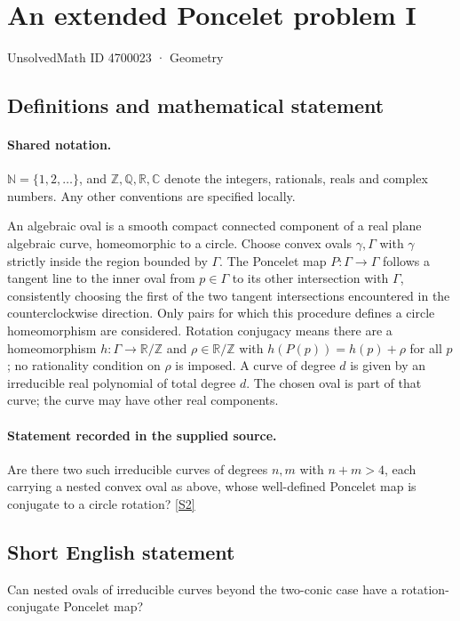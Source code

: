 \documentclass[11pt]{article}
\newcommand{\sref}[2]{\hyperlink{source:#1:#2}{[S#2]}}
\begin{document}
\setcounter{section}{4700022}
\section{An extended Poncelet problem I}\label{4700023}
{\small\sffamily UnsolvedMath ID 4700023 · Geometry}
\subsection{Definitions and mathematical statement}

\paragraph{Shared notation.}$\mathbb N=\{1,2,\ldots\}$, and $\mathbb Z,\mathbb Q,\mathbb R,\mathbb C$ denote the integers, rationals, reals and complex numbers. Any other conventions are specified locally.


An algebraic oval is a smooth compact connected component of a real plane algebraic curve, homeomorphic to a circle. Choose convex ovals $\gamma,\Gamma$ with $\gamma$ strictly inside the region bounded by $\Gamma$. The Poncelet map $P:\Gamma\to\Gamma$ follows a tangent line to the inner oval from $p\in\Gamma$ to its other intersection with $\Gamma$, consistently choosing the first of the two tangent intersections encountered in the counterclockwise direction. Only pairs for which this procedure defines a circle homeomorphism are considered. Rotation conjugacy means there are a homeomorphism $h:\Gamma\to\mathbb R/\mathbb Z$ and $\rho\in\mathbb R/\mathbb Z$ with $h(P(p))=h(p)+\rho$ for all $p$; no rationality condition on $\rho$ is imposed. A curve of degree $d$ is given by an irreducible real polynomial of total degree $d$. The chosen oval is part of that curve; the curve may have other real components.
\paragraph{Statement recorded in the supplied source.}
Are there two such irreducible curves of degrees $n,m$ with $n+m>4$, each carrying a nested convex oval as above, whose well-defined Poncelet map is conjugate to a circle rotation? \sref{4700023}{2}
\subsection{Short English statement}
Can nested ovals of irreducible curves beyond the two-conic case have a rotation-conjugate Poncelet map?
\end{document}
